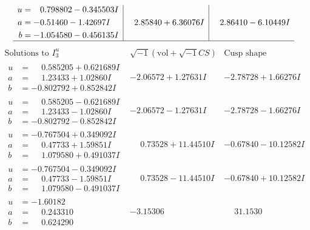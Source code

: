 \documentclass[1p]{elsarticle_modified}
\theoremstyle{definition}
\newcommand{\I}{\sqrt{-1}}
\begin{document}
$$\begin{array}{c|c|c}
\begin{aligned}
u &= \phantom{-}0.798802 - 0.345503 I \\
a &= -0.51460 - 1.42697 I \\
b &= -1.054580 - 0.456135 I\end{aligned}
 & \phantom{-}2.85840 + 6.36076 I & \phantom{-}2.86410 - 6.10449 I\\
 \hline 
 \end{array}$$\newpage$$\begin{array}{c|c|c}  
\text{Solutions to }I^u_{3}& \I (\text{vol} + \sqrt{-1}CS) & \text{Cusp shape}\\
 \hline 
\begin{aligned}
u &= \phantom{-}0.585205 + 0.621689 I \\
a &= \phantom{-}1.23433 + 1.02860 I \\
b &= -0.802792 + 0.852842 I\end{aligned}
 & -2.06572 + 1.27631 I & -2.78728 + 1.66276 I \\ \hline\begin{aligned}
u &= \phantom{-}0.585205 - 0.621689 I \\
a &= \phantom{-}1.23433 - 1.02860 I \\
b &= -0.802792 - 0.852842 I\end{aligned}
 & -2.06572 - 1.27631 I & -2.78728 - 1.66276 I \\ \hline\begin{aligned}
u &= -0.767504 + 0.349092 I \\
a &= \phantom{-}0.47733 + 1.59851 I \\
b &= \phantom{-}1.079580 + 0.491037 I\end{aligned}
 & \phantom{-}0.73528 + 11.44510 I & -0.67840 - 10.12582 I \\ \hline\begin{aligned}
u &= -0.767504 - 0.349092 I \\
a &= \phantom{-}0.47733 - 1.59851 I \\
b &= \phantom{-}1.079580 - 0.491037 I\end{aligned}
 & \phantom{-}0.73528 - 11.44510 I & -0.67840 + 10.12582 I \\ \hline\begin{aligned}
u &= -1.60182\phantom{ +0.000000I} \\
a &= \phantom{-}0.243310\phantom{ +0.000000I} \\
b &= \phantom{-}0.624290\phantom{ +0.000000I}\end{aligned}
 & -3.15306\phantom{ +0.000000I} & \phantom{-}31.1530\phantom{ +0.000000I} \\ \hline\begin{aligned}

\end{aligned}
\end{array}$$
\end{document}
